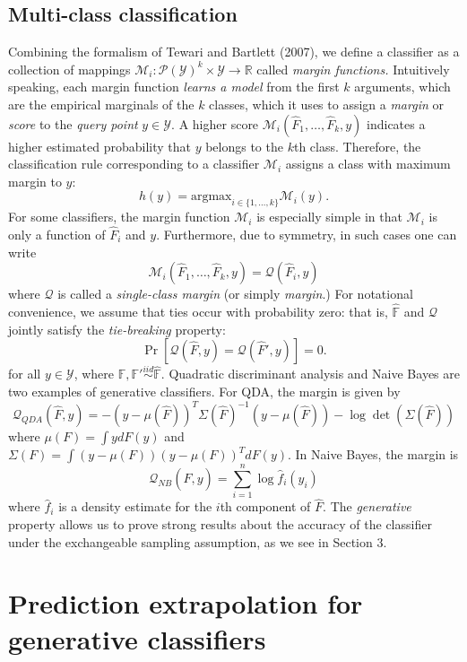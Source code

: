 \documentclass{article}
\newcommand{\argmax}{\text{argmax}}
\begin{document}
\subsection{Multi-class classification}

Combining the formalism of Tewari and Bartlett (2007),
we define a classifier as a collection of mappings
$\mathcal{M}_i: \mathcal{P}(\mathcal{Y})^k \times \mathcal{Y} \to \mathbb{R}$ called \emph{margin functions.}
Intuitively speaking, each margin function \emph{learns a model} from the first $k$ arguments, which are
the empirical marginals of the $k$ classes, which it uses to assign a \emph{margin} or \emph{score} to the
\emph{query point} $y \in \mathcal{Y}$.  A higher score $\mathcal{M}_i(\hat{F}_1,\hdots, \hat{F}_k, y)$ indicates a higher estimated probability that $y$ belongs to the $k$th class.  
Therefore, the classification rule corresponding to a classifier $\mathcal{M}_i$ assigns
a class with maximum margin to $y$:
\[
h(y) = \argmax_{i \in \{1,\hdots, k\}} \mathcal{M}_i(y).
\]
For some classifiers, the margin function $\mathcal{M}_i$ is especially simple
in that $\mathcal{M}_i$ is only a function of $\hat{F}_i$ and $y$.
Furthermore, due to symmetry, in such cases one can write
\[
\mathcal{M}_i(\hat{F}_1,\hdots, \hat{F}_k, y) = \mathcal{Q}(\hat{F}_i, y)
\]
where $\mathcal{Q}$ is called a \emph{single-class margin} (or simply \emph{margin}.)
For notational convenience, we assume that ties occur with probability
zero: that is, $\hat{\mathbb{F}}$ and $\mathcal{Q}$ jointly satisfy the
\emph{tie-breaking} property:
\begin{equation}\label{eq:tie}
\Pr[\mathcal{Q}(\hat{F}, y) = \mathcal{Q}(\hat{F}', y)] = 0.
\end{equation}
for all $y \in \mathcal{Y}$, where $\mathbb{F}, \mathbb{F}' \stackrel{iid}{\sim} \hat{\mathbb{F}}$.
Quadratic discriminant analysis and Naive Bayes are two examples of
generative classifiers.  For QDA, the margin is given by
\[
\mathcal{Q}_{QDA}(\hat{F}, y) = -(y - \mu(\hat{F}))^T \Sigma(\hat{F})^{-1} (y-\mu(\hat{F})) - \log\det(\Sigma(\hat{F}))
\]
where $\mu(F) = \int y dF(y)$ and $\Sigma(F) = \int (y-\mu(F))(y-\mu(F))^T dF(y)$.
In Naive Bayes, the margin is
\[
\mathcal{Q}_{NB}(\hat{F},  y) = \sum_{i=1}^n \log \hat{f}_i(y_i)
\]
where $\hat{f}_i$ is a density estimate for the $i$th component of
$\hat{F}$.
The \emph{generative} property allows us to prove strong results about the accuracy of the classifier
under the exchangeable sampling assumption, as we see in Section 3.

\section{Prediction extrapolation for generative classifiers}
\end{document}
